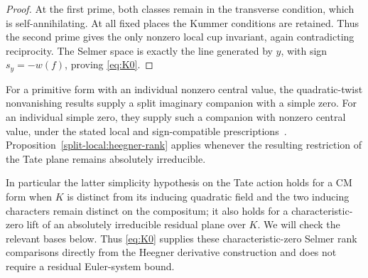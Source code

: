 \begin{proof}
At the first prime, both classes remain in the transverse condition, which is self-annihilating. At all fixed places the Kummer conditions are retained. Thus the second prime gives the only nonzero local cup invariant, again contradicting reciprocity. The Selmer space is exactly the line generated by \(y\), with sign \(s_y=-w(f)\), proving \eqref{eq:K0}.
\end{proof}

\begin{remark}\label{split-local:rank-companions}
For a primitive form with an individual nonzero central value, the quadratic-twist nonvanishing results supply a split imaginary companion with a simple zero. For an individual simple zero, they supply such a companion with nonzero central value, under the stated local and sign-compatible prescriptions~\cite{FH95,BFH90}. Proposition~\ref{split-local:heegner-rank} applies whenever the resulting restriction of the Tate plane remains absolutely irreducible.

In particular the latter simplicity hypothesis on the Tate action holds for a CM form when \(K\) is distinct from its inducing quadratic field and the two inducing characters remain distinct on the compositum; it also holds for a characteristic-zero lift of an absolutely irreducible residual plane over \(K\). We will check the relevant bases below. Thus \eqref{eq:K0} supplies these characteristic-zero Selmer rank comparisons directly from the Heegner derivative construction and does not require a residual Euler-system bound.
\end{remark}
